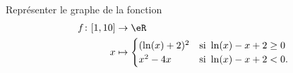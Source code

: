 \begin{exercice}\label{exoSC_serie5-0005}

	Représenter le graphe de la fonction
	\begin{equation}
		\begin{aligned}
			f\colon \mathopen[ 1 , 10 \mathclose]&\to \eR \\
			x&\mapsto \begin{cases}
				(\ln(x)+2)^2	&	\text{si }\ln(x)-x+2\geq 0\\
				x^2-4x	&	 \text{si }\ln(x)-x+2<0.
			\end{cases}
		\end{aligned}
	\end{equation}
	

\end{exercice}
